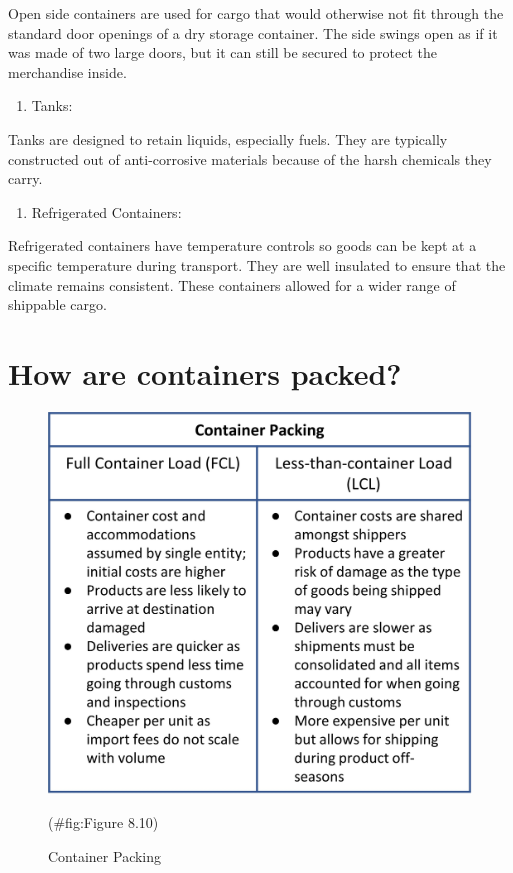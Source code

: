 \documentclass[
]{book}
\providecommand{\tightlist}{%
  \setlength{\itemsep}{0pt}\setlength{\parskip}{0pt}}
\begin{document}
Open side containers are used for cargo that would otherwise not fit through the standard door openings of a dry storage container. The side swings open as if it was made of two large doors, but it can still be secured to protect the merchandise inside.

\begin{enumerate}
\def\labelenumi{\arabic{enumi}.}
\setcounter{enumi}{4}
\tightlist
\item
  Tanks:
\end{enumerate}

Tanks are designed to retain liquids, especially fuels. They are typically constructed out of anti-corrosive materials because of the harsh chemicals they carry.

\begin{enumerate}
\def\labelenumi{\arabic{enumi}.}
\setcounter{enumi}{5}
\tightlist
\item
  Refrigerated Containers:
\end{enumerate}

Refrigerated containers have temperature controls so goods can be kept at a specific temperature during transport. They are well insulated to ensure that the climate remains consistent. These containers allowed for a wider range of shippable cargo.

\hypertarget{seaport-packed}{%
\section{How are containers packed?}\label{seaport-packed}}

\begin{figure}

{\centering \includegraphics{./Images/seaport operation/Container Packing} 

}

\caption{Container Packing}(\#fig:Figure 8.10)
\end{figure}
\end{document}
